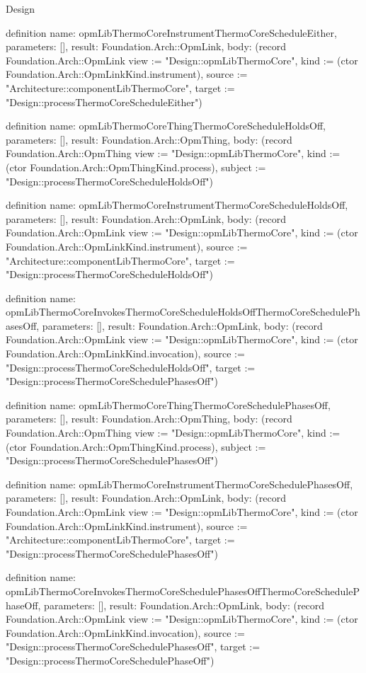 \begin{lexlean}{Design}
\begin{semanticmodule}
definition{
  name: opmLibThermoCoreInstrumentThermoCoreScheduleEither,
  parameters: [],
  result: Foundation.Arch::OpmLink,
  body: (record Foundation.Arch::OpmLink {view := "Design::opmLibThermoCore", kind := (ctor Foundation.Arch::OpmLinkKind.instrument), source := "Architecture::componentLibThermoCore", target := "Design::processThermoCoreScheduleEither"})
}

definition{
  name: opmLibThermoCoreThingThermoCoreScheduleHoldsOff,
  parameters: [],
  result: Foundation.Arch::OpmThing,
  body: (record Foundation.Arch::OpmThing {view := "Design::opmLibThermoCore", kind := (ctor Foundation.Arch::OpmThingKind.process), subject := "Design::processThermoCoreScheduleHoldsOff"})
}

definition{
  name: opmLibThermoCoreInstrumentThermoCoreScheduleHoldsOff,
  parameters: [],
  result: Foundation.Arch::OpmLink,
  body: (record Foundation.Arch::OpmLink {view := "Design::opmLibThermoCore", kind := (ctor Foundation.Arch::OpmLinkKind.instrument), source := "Architecture::componentLibThermoCore", target := "Design::processThermoCoreScheduleHoldsOff"})
}

definition{
  name: opmLibThermoCoreInvokesThermoCoreScheduleHoldsOffThermoCoreSchedulePhasesOff,
  parameters: [],
  result: Foundation.Arch::OpmLink,
  body: (record Foundation.Arch::OpmLink {view := "Design::opmLibThermoCore", kind := (ctor Foundation.Arch::OpmLinkKind.invocation), source := "Design::processThermoCoreScheduleHoldsOff", target := "Design::processThermoCoreSchedulePhasesOff"})
}

definition{
  name: opmLibThermoCoreThingThermoCoreSchedulePhasesOff,
  parameters: [],
  result: Foundation.Arch::OpmThing,
  body: (record Foundation.Arch::OpmThing {view := "Design::opmLibThermoCore", kind := (ctor Foundation.Arch::OpmThingKind.process), subject := "Design::processThermoCoreSchedulePhasesOff"})
}

definition{
  name: opmLibThermoCoreInstrumentThermoCoreSchedulePhasesOff,
  parameters: [],
  result: Foundation.Arch::OpmLink,
  body: (record Foundation.Arch::OpmLink {view := "Design::opmLibThermoCore", kind := (ctor Foundation.Arch::OpmLinkKind.instrument), source := "Architecture::componentLibThermoCore", target := "Design::processThermoCoreSchedulePhasesOff"})
}

definition{
  name: opmLibThermoCoreInvokesThermoCoreSchedulePhasesOffThermoCoreSchedulePhaseOff,
  parameters: [],
  result: Foundation.Arch::OpmLink,
  body: (record Foundation.Arch::OpmLink {view := "Design::opmLibThermoCore", kind := (ctor Foundation.Arch::OpmLinkKind.invocation), source := "Design::processThermoCoreSchedulePhasesOff", target := "Design::processThermoCoreSchedulePhaseOff"})
}


\end{semanticmodule}
\end{lexlean}
